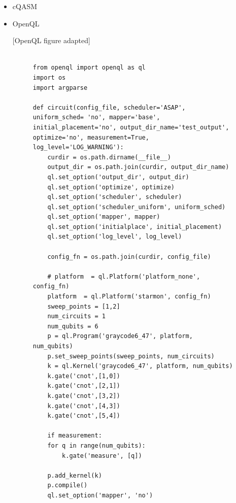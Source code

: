 \begin{itemize}
\item cQASM
\label{sec:org87e308e}


\item OpenQL
\label{sec:org7b0851a}

[OpenQL figure adapted]

\begin{figure}
\centering
\begin{minipage}{.45\textwidth}

\begin{verbatim}

from openql import openql as ql
import os
import argparse

def circuit(config_file, scheduler='ASAP', uniform_sched= 'no', mapper='base', initial_placement='no', output_dir_name='test_output', optimize='no', measurement=True, log_level='LOG_WARNING'):
    curdir = os.path.dirname(__file__)
    output_dir = os.path.join(curdir, output_dir_name)
    ql.set_option('output_dir', output_dir)
    ql.set_option('optimize', optimize)
    ql.set_option('scheduler', scheduler)
    ql.set_option('scheduler_uniform', uniform_sched)
    ql.set_option('mapper', mapper)
    ql.set_option('initialplace', initial_placement)
    ql.set_option('log_level', log_level)

    config_fn = os.path.join(curdir, config_file)

    # platform  = ql.Platform('platform_none', config_fn)
    platform  = ql.Platform('starmon', config_fn)
    sweep_points = [1,2]
    num_circuits = 1
    num_qubits = 6
    p = ql.Program('graycode6_47', platform, num_qubits)
    p.set_sweep_points(sweep_points, num_circuits)
    k = ql.Kernel('graycode6_47', platform, num_qubits)
    k.gate('cnot',[1,0])
    k.gate('cnot',[2,1])
    k.gate('cnot',[3,2])
    k.gate('cnot',[4,3])
    k.gate('cnot',[5,4])

    if measurement:
	for q in range(num_qubits):
	    k.gate('measure', [q])

    p.add_kernel(k)
    p.compile()
    ql.set_option('mapper', 'no')


\end{verbatim}
\end{minipage}
\end{figure}
\end{itemize}
